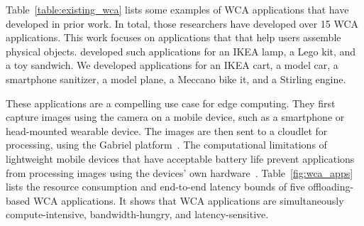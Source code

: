 Table~{\ref{table:existing_wca}} lists some examples of WCA applications that
have developed in prior work.
In total, those researchers have developed over 15 WCA applications.
This work focuses on applications that that help users assemble physical
objects.
\citet{chen2017} developed such applications for an IKEA lamp, a Lego kit,
and a toy sandwich.
We developed applications for an IKEA cart, a model car, a smartphone sanitizer,
a model plane, a Meccano bike it, and a Stirling engine.

These applications are a compelling use case for edge computing.
They first capture images using the camera on a mobile device, such as a
smartphone or head-mounted wearable device.
The images are then sent to a cloudlet for processing, using the Gabriel
platform~\cite{ha2014}.
The computational limitations of lightweight mobile devices that have acceptable
battery life prevent applications from processing images using the
devices' own hardware~{\cite{Satya2009}}.
Table~\ref{fig:wca_apps} lists the resource consumption and end-to-end latency
bounds of five offloading-based WCA applications.
It shows that WCA applications are simultaneously compute-intensive,
bandwidth-hungry, and latency-sensitive.


